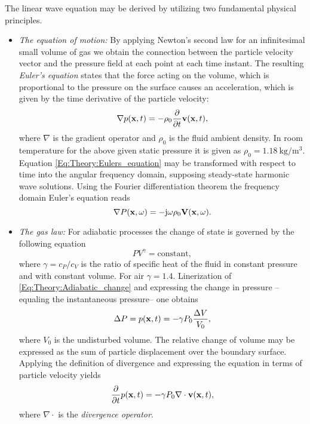 The linear wave equation may be derived by utilizing two fundamental physical principles.
\begin{itemize}
\item \emph{The equation of motion:} By applying Newton's second law for an infinitesimal small volume of gas we obtain the connection between the particle velocity vector and the pressure field at each point at each time instant. The resulting \emph{Euler's equation} states that the force acting on the volume, which is proportional to the pressure on the surface causes an acceleration, which is given by the time derivative of the particle velocity:
\begin{equation}
\nabla p(\mathbf{x},t) = -\rho_0 \frac{\partial}{\partial t} \mathbf{v}(\mathbf{x},t),
\label{Eq:Theory:Eulers_equation}
\end{equation}
where $\nabla$ is the gradient operator and $\rho_0$ is the fluid ambient density. In room temperature for the above given static pressure it is given as $\rho_0 = 1.18~\mathrm{kg}/\mathrm{m}^3$.
Equation \eqref{Eq:Theory:Eulers_equation} may be transformed with respect to time into the angular frequency domain, supposing steady-state harmonic wave solutions. Using the Fourier differentiation theorem the frequency domain Euler's equation reads
\begin{equation}
\nabla P(\mathbf{x},\omega) = -\mathrm{j} \omega \rho_0 \mathbf{V}(\mathbf{x},\omega).
\label{Eq:Theory:Freq_Eulers_equation}
\end{equation}

\item \emph{The gas law:} For adiabatic processes the change of state is governed by the following equation
\begin{equation}
P V^{\gamma} = \mathrm{constant},
\label{Eq:Theory:Adiabatic_change}
\end{equation}
where $\gamma = c_P/c_V$ is the ratio of specific heat of the fluid in constant pressure and with constant volume. For air $\gamma = 1.4$. Linerization of \eqref{Eq:Theory:Adiabatic_change} and expressing the change in pressure --equaling the instantaneous pressure-- one obtains
\begin{equation}
\Delta P = p(\mathbf{x},t) = -\gamma P_0 \frac{\Delta V}{V_0},
\end{equation}
where $V_0$ is the undisturbed volume. The relative change of volume may be expressed as the sum of particle displacement over the boundary surface. Applying the definition of divergence and expressing the equation in terms of particle velocity yields
\begin{equation}
\frac{\partial}{\partial t} p(\mathbf{x},t) = -\gamma P_0 \nabla \cdot \mathbf{v}(\mathbf{x},t),
\label{Eq:Theory:Second_eq}
\end{equation}
where $\nabla \cdot$ is the \emph{divergence operator}.
\end{itemize}

